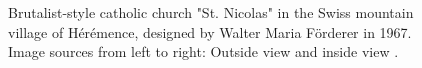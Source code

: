 \documentclass{article}
\begin{document}
\begin{figure}
    \centering
    \caption{Brutalist-style catholic church "St. Nicolas" in the Swiss mountain village of Hérémence, designed by Walter Maria Förderer in 1967. Image sources from left to right: Outside view \cite{bissegger_eglise_2018-1} and inside view \cite{bissegger_eglise_2018}.}
    \label{fig:kunstformen}
\end{figure}

\clearpage
\printbibliography
\end{document}
